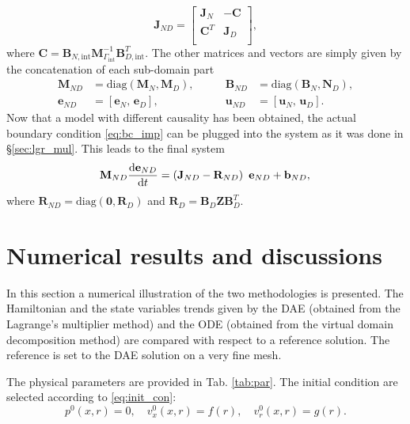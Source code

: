 \documentclass{ifacconf}
\newcommand{\secref}[1]{\S\ref{#1}}
\begin{document}
\[
\mathbf{J}_{ND} = 
\begin{bmatrix}
\mathbf{J}_N & -\mathbf{C} \\
\mathbf{C}^T & \mathbf{J}_D \\
\end{bmatrix},
\]
where $\mathbf{C} = \mathbf{B}_{N, \text{int}} \mathbf{M}_{\Gamma_{\text{int}}}^{-1} \mathbf{B}_{D, \text{int}}^T$. The other matrices and vectors are simply given by the concatenation of each sub-domain part
\begin{equation*}
\begin{aligned}
\mathbf{M}_{ND} &= \text{diag}(\mathbf{M}_N, \mathbf{M}_D), \\
\mathbf{e}_{ND} &= [\mathbf{e}_N, \, \mathbf{e}_D], 
\end{aligned} \qquad 
\begin{aligned}
\mathbf{B}_{ND} &= \text{diag}(\mathbf{B}_N, \mathbf{N}_D), \\
\mathbf{u}_{ND} &= [\mathbf{u}_N, \, \mathbf{u}_D].
\end{aligned}
\end{equation*}
Now that a model with different causality has been obtained, the actual boundary condition \eqref{eq:bc_imp} can be plugged into the system as it was done in \secref{sec:lgr_mul}. This leads to the final system
\begin{equation}
\label{eq:sys_ode}
\mathbf{M}_{ND} \diff{\mathbf{e}_{ND}}{t} = \left(\mathbf{J}_{ND} - \mathbf{R}_{ND} \right) \ \mathbf{e}_{ND} + \mathbf{b}_{ND}, \\
\end{equation}
where $\mathbf{R}_{ND} = \text{diag}(\mathbf{0}, \mathbf{R}_D)$ and $\mathbf{R}_D = \mathbf{B}_D \mathbf{Z} \mathbf{B}_D^T$.

\section{Numerical results and discussions}
\label{sec:numerics}
In this section a numerical illustration of the two methodologies is presented. The Hamiltonian and the state variables trends given by the DAE (obtained from the Lagrange's multiplier method) and the ODE (obtained from the virtual domain decomposition method) are compared with respect to a reference solution. The reference is set to the DAE solution on a very fine mesh.

The physical parameters are provided in Tab. \ref{tab:par}. 
The initial condition are selected according to \eqref{eq:init_con}:
\begin{equation*}
p^0(x, r) = 0 , \quad v_x^0(x, r) = f(r), \quad v_r^0(x, r) = g(r). 
\end{equation*}
\end{document}
